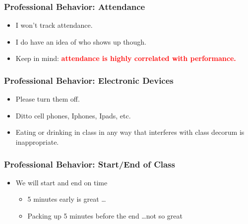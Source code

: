 \documentclass[10pt]{beamer}
\begin{document}

\begin{frame}[t]
\frametitle{Professional Behavior: Attendance}
\begin{itemize}
\item I won't track attendance.
\bigskip
\item I do have an idea of who shows up though.
\bigskip
\item Keep in mind: \textcolor{red}{\textbf{attendance is highly correlated with performance.}}
\end{itemize}
\end{frame}


\begin{frame}[t]
\frametitle{Professional Behavior: Electronic Devices}
\begin{itemize}
\item Please turn them off.
\bigskip
\item Ditto cell phones, Iphones, Ipads, etc.
\bigskip
\item Eating or drinking in class in any way that interferes with class decorum is inappropriate.
\end{itemize}
\end{frame}


\begin{frame}[t]
\frametitle{Professional Behavior: Start/End of Class}
\begin{itemize}
\item We will start and end on time
\begin{itemize}
\medskip
\item 5 minutes early is great \ldots
\medskip
\item Packing up 5 minutes before the end \ldots not so great
\end{itemize}
\end{itemize}
\end{frame}
\end{document}
